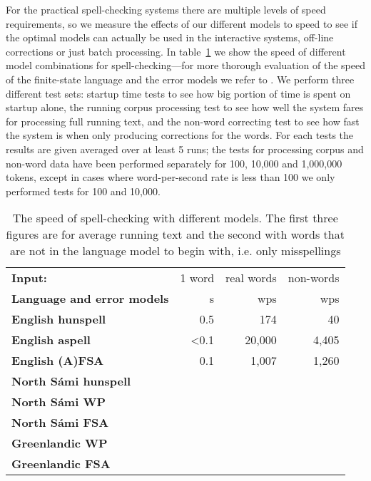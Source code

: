 \documentclass[a4paper,12pt]{article}
\begin{document}
For the practical spell-checking systems there are multiple levels of speed
requirements, so we measure the effects of our different models to speed to see
if the optimal models can actually be used in the interactive systems, off-line
corrections or just batch processing. In table~\ref{table:language-speed} we
show the speed of different model combinations for spell-checking---for more
thorough evaluation of the speed of the finite-state language and the error
models we refer to \cite{pirinen2012improving}. We perform three different test
sets: startup time tests to see how big portion of time is spent on startup
alone, the running corpus processing test to see how well the system fares for
processing full running text, and the non-word correcting test to see how fast
the system is when only producing corrections for the words. For each tests
the results are given averaged over at least 5 runs; the tests for processing
corpus and non-word data have been performed separately for 100, 10,000 and
1,000,000 tokens, except in cases where word-per-second rate is less than 100
we only performed tests for 100 and 10,000.

\begin{table}
    \centering
    \begin{tabular}{|l|r|r|r|}
        \hline
        \bf Input: & 1 word & real words & non-words \\
        \bf Language and error models & s & wps & wps \\
        \hline
        \bf English hunspell & 0.5 & 174 & 40 \\
          \bf English aspell & <0.1 & 20,000 & 4,405 \\

          \bf English (A)FSA & 0.1 & 1,007 & 1,260 \\
        \hline
   \bf North Sámi hunspell & & & \\
        \bf North Sámi WP  & & & \\
        \bf North Sámi FSA & & & \\
        \hline
        \bf Greenlandic WP & & & \\
       \bf Greenlandic FSA & & & \\
        \hline
    \end{tabular}
    \caption{The speed of spell-checking with different models. The first three
    figures are for average running text and the second with words that are not
    in the language model to begin with, i.e. only
    misspellings\label{table:language-speed}}
\end{table}
\end{document}
